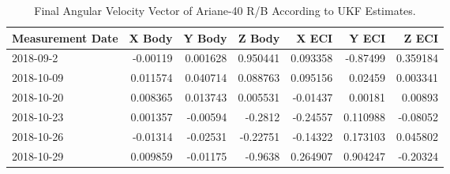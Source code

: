 \begin{table}[htbp]\label{ariane_table}
	\centering
	
	\begin{tabular}{| l | r | r | r | r| r | r |}
		\hline Measurement Date & X Body & Y Body & Z Body & X ECI & Y ECI & Z ECI \\
		\hline 2018-09-2 & -0.00119 & 0.001628 & 0.950441 & 0.093358 & -0.87499 & 0.359184 \\
		\hline 2018-10-09 & 0.011574 & 0.040714 & 0.088763 & 0.095156 & 0.02459 & 0.003341 \\
		\hline 2018-10-20 & 0.008365 & 0.013743 & 0.005531 & -0.01437 & 0.00181 & 0.00893 \\
		\hline 2018-10-23 & 0.001357 & -0.00594 & -0.2812 & -0.24557 & 0.110988 & -0.08052 \\
		\hline 2018-10-26 & -0.01314 & -0.02531 & -0.22751 & -0.14322 & 0.173103 & 0.045802 \\
		\hline 2018-10-29 & 0.009859 & -0.01175 & -0.9638 & 0.264907 & 0.904247 & -0.20324 \\
		\hline 
	\end{tabular}%
	\caption{Final Angular Velocity Vector of Ariane-40 R/B According to UKF Estimates.}
\end{table}%
